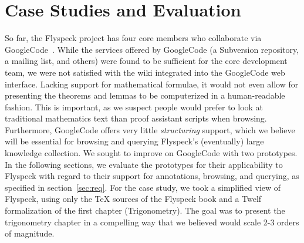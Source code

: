 
\section{Case Studies and Evaluation}

So far, the Flyspeck project has four core members who collaborate via
GoogleCode~\cite{website:FlyspeckProjectPage}.  While the services offered by
GoogleCode (a Subversion repository, a mailing list, and others) were
found to be sufficient for the core development team, we were not
satisfied with the wiki integrated into the GoogleCode web interface.
Lacking support for mathematical formulae, it would not even allow for
presenting the theorems and lemmas to be computerized in a
human-readable fashion.  This is important, as we suspect people would
prefer to look at traditional mathematics text than proof assistant
scripts when browsing.  Furthermore, GoogleCode offers very
little \emph{structuring} support, which we believe will be
essential for browsing and querying Flyspeck's 
(eventually) large knowledge collection.  We sought to improve
on GoogleCode with two prototypes.  
In the following sections, we evaluate the prototypes 
for their applicability to Flyspeck with regard to their
support for annotations, browsing, and querying, as specified in
section~\ref{sec:req}.  For the case study, we took a simplified 
view of Flyspeck, using only the {\TeX} sources of the
Flyspeck book and a Twelf formalization of the first chapter (Trigonometry).
The goal was to present the trigonometry chapter in a compelling way
that we believed would scale 2-3 orders of magnitude.  

